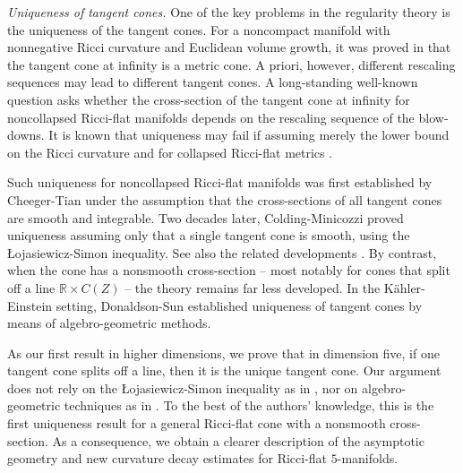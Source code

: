 \documentclass[11pt,reqno]{amsart}
\numberwithin{equation}{section}
\newcommand{\RR}{\mathds{R}}
\theoremstyle{definition}
\theoremstyle{remark}
\begin{document}
\emph{Uniqueness of tangent cones.}
One of the key problems in the regularity theory is the uniqueness of the tangent cones. For a noncompact manifold with nonnegative Ricci curvature and Euclidean volume growth, it was proved in \cite{cc} that the tangent cone at infinity is a metric cone. A priori, however, different rescaling sequences may lead to different tangent cones.  A long-standing well-known question asks whether the cross-section of the tangent cone at infinity for noncollapsed Ricci-flat manifolds depends on the rescaling sequence of the blow-downs. It is known that uniqueness may fail if assuming merely the lower bound on the Ricci curvature \cite{per,cc,con13} and for collapsed Ricci-flat metrics \cite{hat1}.




Such uniqueness for noncollapsed Ricci-flat manifolds was first established by Cheeger-Tian \cite{ct} under the assumption that the cross-sections of all tangent cones are smooth and integrable. Two decades later, Colding-Minicozzi \cite{cm14} proved uniqueness assuming only that a single tangent cone is smooth, using the Łojasiewicz-Simon inequality. See also the related developments \cite{ksz24,yz25}. By contrast, when the cone has a nonsmooth cross-section -- most notably for cones that split off a line $\mathbb{R}\times C(Z)$ -- the theory remains far less developed. In the Kähler-Einstein setting, Donaldson-Sun \cite{ds17} established uniqueness of tangent cones by means of algebro-geometric methods.

As our first result in higher dimensions, we prove that in dimension five, if one tangent cone splits off a line, then it is the unique tangent cone. Our argument does not rely on the Łojasiewicz-Simon inequality as in \cite{cm14}, nor on algebro-geometric techniques as in \cite{ds17}. To the best of the authors’ knowledge, this is the first uniqueness result for a general Ricci-flat cone with a nonsmooth cross-section. As a consequence, we obtain a clearer description of the asymptotic geometry and new curvature decay estimates for Ricci-flat $5$-manifolds.
\end{document}
